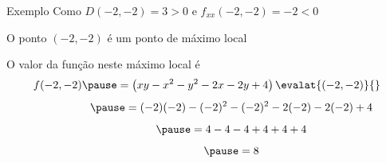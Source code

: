 \begin{frame}{Exemplo \theexemplo}
  Como \(D(-2, -2)=3>0\)
  \pause
  e  \(f_{xx}(-2, -2) = -2 < 0\)

  \pause
  \vspace{\baselineskip}
  O ponto \((-2, -2)\) é um ponto de máximo local

  \pause
  \vspace{\baselineskip}
  O valor da função neste máximo local é
  \[
    f(-2, -2)
    \pause
    = \left(xy -x^2 - y^2 -2x -2y +4\right)\evalat{(-2, -2)}{}
  \]
  \[
    \hphantom{f(-2, -2)}
    \pause
    = (-2)(-2) - (-2)^2 - (-2)^2 -2(-2) -2(-2) + 4
  \]
  \[
    \hphantom{f(-2, -2)}
    \pause
    = 4 -4 -4 +4 +4 + 4
  \]
  \[
    \hphantom{f(-2, -2)}
    \pause
    = 8
  \]
\end{frame}

